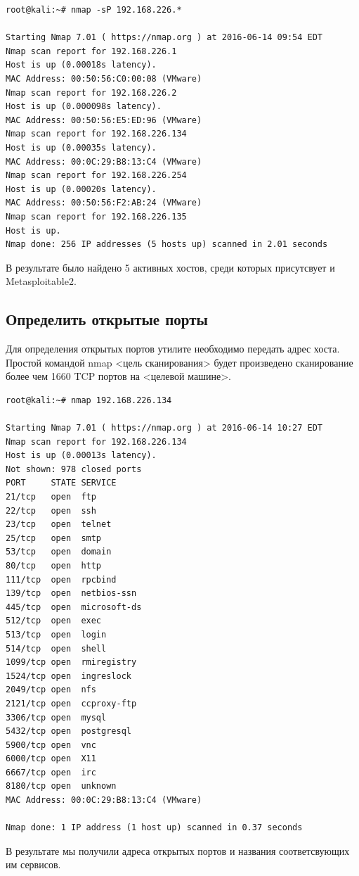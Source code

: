 \documentclass[10pt,a4paper,titlepage]{article}
\begin{document}
\begin{verbatim}
root@kali:~# nmap -sP 192.168.226.*

Starting Nmap 7.01 ( https://nmap.org ) at 2016-06-14 09:54 EDT
Nmap scan report for 192.168.226.1
Host is up (0.00018s latency).
MAC Address: 00:50:56:C0:00:08 (VMware)
Nmap scan report for 192.168.226.2
Host is up (0.000098s latency).
MAC Address: 00:50:56:E5:ED:96 (VMware)
Nmap scan report for 192.168.226.134
Host is up (0.00035s latency).
MAC Address: 00:0C:29:B8:13:C4 (VMware)
Nmap scan report for 192.168.226.254
Host is up (0.00020s latency).
MAC Address: 00:50:56:F2:AB:24 (VMware)
Nmap scan report for 192.168.226.135
Host is up.
Nmap done: 256 IP addresses (5 hosts up) scanned in 2.01 seconds
\end{verbatim}

В результате было найдено 5 активных хостов, среди которых присутсвует и Metasploitable2.

\subsection{Определить открытые порты}
Для определения открытых портов утилите необходимо передать адрес хоста. Простой командой nmap <цель сканирования> будет произведено сканирование более чем 1660 TCP портов на <целевой машине>. 
\begin{verbatim}
root@kali:~# nmap 192.168.226.134

Starting Nmap 7.01 ( https://nmap.org ) at 2016-06-14 10:27 EDT
Nmap scan report for 192.168.226.134
Host is up (0.00013s latency).
Not shown: 978 closed ports
PORT     STATE SERVICE
21/tcp   open  ftp
22/tcp   open  ssh
23/tcp   open  telnet
25/tcp   open  smtp
53/tcp   open  domain
80/tcp   open  http
111/tcp  open  rpcbind
139/tcp  open  netbios-ssn
445/tcp  open  microsoft-ds
512/tcp  open  exec
513/tcp  open  login
514/tcp  open  shell
1099/tcp open  rmiregistry
1524/tcp open  ingreslock
2049/tcp open  nfs
2121/tcp open  ccproxy-ftp
3306/tcp open  mysql
5432/tcp open  postgresql
5900/tcp open  vnc
6000/tcp open  X11
6667/tcp open  irc
8180/tcp open  unknown
MAC Address: 00:0C:29:B8:13:C4 (VMware)

Nmap done: 1 IP address (1 host up) scanned in 0.37 seconds

\end{verbatim}
В результате мы получили адреса открытых портов и названия соответсвующих им сервисов.
\end{document}

